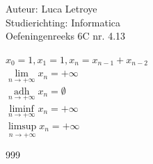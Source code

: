 \documentclass[a4paper]{article}
\begin{document}
  
\noindent \large Auteur: Luca Letroye \\
\noindent \large Studierichting: Informatica\\
\noindent \large Oefeningenreeks 6C nr. 4.13

\medskip
\normalsize

$x_0 = 1, x_1 = 1, x_n = x_{n-1}+x_{n-2}$\\

$\lim\limits_{n \rightarrow +\infty} x_n = +\infty$\\

$\operatorname*{adh}\limits_{n \rightarrow +\infty} x_n = \emptyset$\\

$\liminf\limits_{n \rightarrow +\infty} x_n = +\infty$\\

$\limsup\limits_{n \rightarrow +\infty} x_n = +\infty$\\






\begin{thebibliography}{999}
\end{thebibliography}
\end{document}
